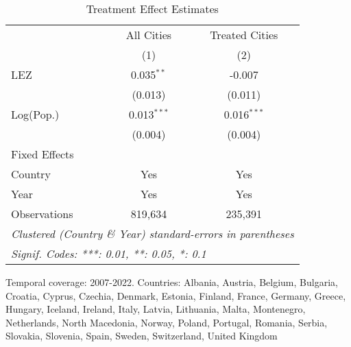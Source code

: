 
\begin{table}[htbp]
   \caption{\label{tab:te} Treatment Effect Estimates}
   \centering
   \small
   \begin{tabular}{lcc}
      \tabularnewline \midrule \midrule
                   & All Cities    & Treated Cities \\   
                   & (1)           & (2)\\  
      LEZ          & 0.035$^{**}$  & -0.007\\   
                   & (0.013)       & (0.011)\\   
      Log(Pop.)    & 0.013$^{***}$ & 0.016$^{***}$\\   
                   & (0.004)       & (0.004)\\   
      Fixed Effects\\
      Country      & Yes           & Yes\\  
      Year         & Yes           & Yes\\  
      \midrule 
      Observations & 819,634       & 235,391\\  
      \midrule \midrule
      \multicolumn{3}{l}{\emph{Clustered (Country \& Year) standard-errors in parentheses}}\\
      \multicolumn{3}{l}{\emph{Signif. Codes: ***: 0.01, **: 0.05, *: 0.1}}\\
   \end{tabular}
   
   \par \raggedright 
   Temporal coverage: 2007-2022. Countries: Albania, Austria, Belgium, Bulgaria, Croatia, Cyprus, Czechia, Denmark, Estonia, Finland, France, Germany, Greece, Hungary, Iceland, Ireland, Italy, Latvia, Lithuania, Malta, Montenegro, Netherlands, North Macedonia, Norway, Poland, Portugal, Romania, Serbia, Slovakia, Slovenia, Spain, Sweden, Switzerland, United Kingdom
\end{table}


